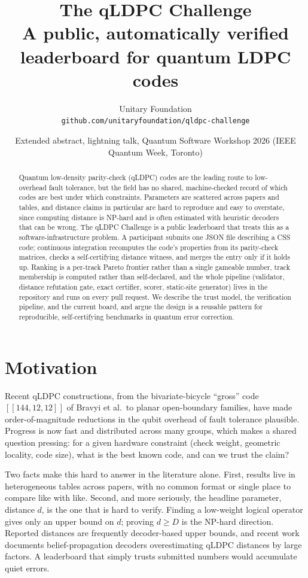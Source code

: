 \documentclass[11pt]{article}
\title{\textbf{The qLDPC Challenge}\\[4pt]
  \large A public, automatically verified leaderboard for quantum LDPC codes}
\author{Unitary Foundation\\
  \texttt{github.com/unitaryfoundation/qldpc-challenge}}
\date{Extended abstract, lightning talk, Quantum Software Workshop 2026
  (IEEE Quantum Week, Toronto)}
\begin{document}
\maketitle

\begin{abstract}
Quantum low-density parity-check (qLDPC) codes are the leading route to
low-overhead fault tolerance, but the field has no shared, machine-checked record
of which codes are best under which constraints. Parameters are scattered across
papers and tables, and distance claims in particular are hard to reproduce and
easy to overstate, since computing distance is NP-hard and is often estimated
with heuristic decoders that can be wrong. The qLDPC Challenge is a public
leaderboard that treats this as a software-infrastructure problem. A participant
submits one JSON file describing a CSS code; continuous integration recomputes
the code's properties from its parity-check matrices, checks a self-certifying
distance witness, and merges the entry only if it holds up. Ranking is a
per-track Pareto frontier rather than a single gameable number, track membership
is computed rather than self-declared, and the whole pipeline (validator,
distance refutation gate, exact certifier, scorer, static-site generator) lives
in the repository and runs on every pull request. We describe the trust model,
the verification pipeline, and the current board, and argue the design is a
reusable pattern for reproducible, self-certifying benchmarks in quantum error
correction.
\end{abstract}

\section{Motivation}

Recent qLDPC constructions, from the bivariate-bicycle ``gross'' code
$[[144,12,12]]$ of Bravyi et al.\ to planar open-boundary families, have made
order-of-magnitude reductions in the qubit overhead of fault tolerance plausible.
Progress is now fast and distributed across many groups, which makes a shared
question pressing: for a given hardware constraint (check weight, geometric
locality, code size), what is the best known code, and can we trust the claim?

Two facts make this hard to answer in the literature alone. First, results live
in heterogeneous tables across papers, with no common format or single place to
compare like with like. Second, and more seriously, the headline parameter,
distance $d$, is the one that is hard to verify. Finding a low-weight logical
operator gives only an upper bound on $d$; proving $d \ge D$ is the NP-hard
direction. Reported distances are frequently decoder-based upper bounds, and
recent work documents belief-propagation decoders overestimating qLDPC distances
by large factors. A leaderboard that simply trusts submitted numbers would
accumulate quiet errors.
\end{document}
